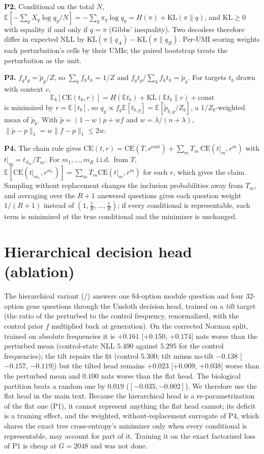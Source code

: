 \textbf{P2.} Conditional on the total $N$, $\mathbb{E}[-\sum_gX_g\log q_g/N]=-\sum_g\pi_g\log q_g=H(\pi)+\mathrm{KL}(\pi\|q)$, and $\mathrm{KL}\ge0$ with equality if and only if $q=\pi$ (Gibbs' inequality). Two decoders therefore differ in expected NLL by $\mathrm{KL}(\pi\|q_A)-\mathrm{KL}(\pi\|q_B)$. Per-UMI scoring weights each perturbation's cells by their UMIs; the paired bootstrap treats the perturbation as the unit.

\textbf{P3.} $f_gt_g=\tilde p_g/Z$, so $\sum_hf_ht_h=1/Z$ and $f_gt_g/\sum_hf_ht_h=\tilde p_g$. For targets $t_b$ drawn with context $c$, \[\mathbb{E}_b[\mathrm{CE}(t_b,r)]=H(\mathbb{E}t_b)+\mathrm{KL}(\mathbb{E}t_b\|r)+\text{const}\] is minimized by $r=\mathbb{E}[t_b]$, so $q_g\propto f_g\mathbb{E}[t_{b,g}]=\mathbb{E}[\tilde p_{b,g}/Z_b]$, a $1/Z_b$-weighted mean of $\tilde p_b$. With $\tilde p=(1-w)p+wf$ and $w=\lambda/(n+\lambda)$, $\lVert\tilde p-p\rVert_1=w\lVert f-p\rVert_1\le2w$.

\textbf{P4.} The chain rule gives $\mathrm{CE}(t,r)=\mathrm{CE}(T,r^{\mathrm{root}})+\sum_mT_m\,\mathrm{CE}(t|_m,r^m)$ with $t|_m=t_{S_m}/T_m$. For $m_1,\dots,m_R$ i.i.d.\ from $T$, $\mathbb{E}[\mathrm{CE}(t|_{m_r},r^{m_r})]=\sum_mT_m\mathrm{CE}(t|_m,r^m)$ for each $r$, which gives the claim. Sampling without replacement changes the inclusion probabilities away from $T_m$, and averaging over the $R{+}1$ answered questions gives each question weight $1/(R{+}1)$ instead of $(1,\tfrac1R,\dots,\tfrac1R)$; if every conditional is representable, each term is minimized at the true conditional and the minimizer is unchanged.
\section{Hierarchical decision head (ablation)}\label{app:tree}
The hierarchical variant (\cadn{}/\cadr{}) answers one 64-option module question and four 32-option gene questions through the Unsloth decision head, trained on a \emph{tilt} target (the ratio of the perturbed to the control frequency, renormalized, with the control prior $f$ multiplied back at generation). On the corrected Norman split, trained on absolute frequencies it is $+0.161$ [$+0.150$, $+0.174$] nats worse than the perturbed mean (control-state NLL $5.490$ against $5.295$ for the control frequencies); the tilt repairs the fit (control $5.300$; tilt minus no-tilt $-0.138$ [$-0.157$, $-0.119$]) but the tilted head remains $+0.023$ [$+0.009$, $+0.038$] worse than the perturbed mean and $0.100$ nats worse than the flat head. The biological partition beats a random one by $0.019$ ($[-0.035,-0.002]$). We therefore use the flat head in the main text. Because the hierarchical head is a re-parametrization of the flat one (P1), it cannot represent anything the flat head cannot; its deficit is a training effect, and the weighted, without-replacement surrogate of P4, which shares the exact tree cross-entropy's minimizer only when every conditional is representable, may account for part of it. Training it on the exact factorized loss of P1 is cheap at $G=2048$ and was not done.


